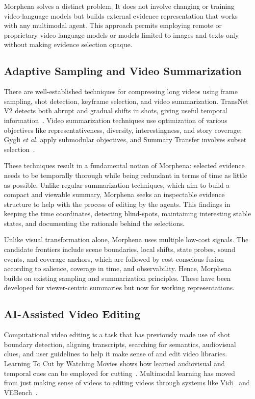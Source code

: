 \documentclass[conference]{IEEEtran}
\begin{document}
Morphena solves a distinct problem. It does not involve changing or training video-language models but builds external evidence representation that works with any multimodal agent. This approach permits employing remote or proprietary video-language models or models limited to images and texts only without making evidence selection opaque.

\subsection{Adaptive Sampling and Video Summarization}

There are well-established techniques for compressing long videos using frame sampling, shot detection, keyframe selection, and video summarization. TransNet V2 detects both abrupt and gradual shifts in shots, giving useful temporal information~\cite{soucek2020transnetv2}. Video summarization techniques use optimization of various objectives like representativeness, diversity, interestingness, and story coverage; Gygli \textit{et al.} apply submodular objectives, and Summary Transfer involves subset selection~\cite{gygli2015submodular,zhang2016summarytransfer}.

These techniques result in a fundamental notion of Morphena: selected evidence needs to be temporally thorough while being redundant in terms of time as little as possible. Unlike regular summarization techniques, which aim to build a compact and viewable summary, Morphena seeks an inspectable evidence structure to help with the process of editing by the agents. This findings in keeping the time coordinates, detecting blind-spots, maintaining interesting stable states, and documenting the rationale behind the selections.

Unlike visual transformation alone, Morphena uses multiple low-cost signals. The candidate frontiers include scene boundaries, local shifts, state probes, sound events, and coverage anchors, which are followed by cost-conscious fusion according to salience, coverage in time, and observability. Hence, Morphena builds on existing sampling and summarization principles. These have been developed for viewer-centric summaries but now for working representations.

\subsection{AI-Assisted Video Editing}

Computational video editing is a task that has previously made use of shot boundary detection, aligning transcripts, searching for semantics, audiovisual clues, and user guidelines to help it make sense of and edit video libraries. Learning To Cut by Watching Movies shows how learned audiovisual and temporal cues can be employed for cutting~\cite{pardo2021learningtocut}. Multimodal learning has moved from just making sense of videos to editing videos through systems like Vidi~\cite{vidi2025} and VEBench~\cite{deng2026vebench}.
\end{document}
